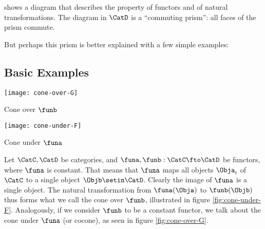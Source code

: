 



 shows a diagram that describes the property of functors and of natural transformations.
The diagram in $\CatD$ is a ``commuting prism'': all faces of the prism commute.

\begin{figure*}[h]
    \centering
    \begin{ctdefinitionshade}
        \small
    \end{ctdefinitionshade}
    \caption{}
    \label{fig:nat_trans_graphically}
\end{figure*}

But perhaps this prism is better explained with a few simple examples:

\subsection{Basic Examples}

\begin{marginfigure}
    \centering
    \texttt{[image: cone-over-G]}
    \caption{Cone over $\funb$}
    \label{fig:cone-over-G}

\begin{marginfigure}
    \centering
    \texttt{[image: cone-under-F]}
    \label{fig:cone-under-F}
    \caption{Cone under $\funa$}
\end{marginfigure}

\end{marginfigure}
\begin{example}
Let $\CatC, \CatD$ be categories, and $\funa, \funb:\CatC\fto\CatD$ be functors, where $\funa$ is constant. That means that $\funa$ maps all objects $\Obja_i$ of $\CatC$ to a single object $\Objb \setin \CatD$. Clearly the image of $\funa$ is a single object. The natural transformation from $\funa(\Obja)$ to $\funb(\Objb)$ thus forms what we call the cone over $\funb$, illustrated in figure \cref{fig:cone-under-F}.
Analogously, if we consider $\funb$ to be a constant functor, we talk about the cone under $\funa$ (or cocone), as seen in figure \cref{fig:cone-over-G}.
\end{example}


